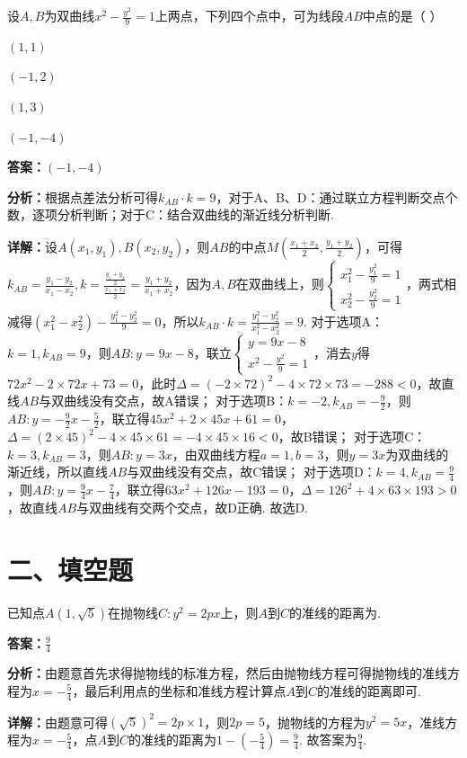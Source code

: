 \begin{question}[points=5]
设$A,B$为双曲线$x^2-\frac{y^2}{9}=1$上两点，下列四个点中，可为线段$AB$中点的是（   ）
\begin{choices}
  \item $(1,1)$
  \item $(-1,2)$
  \item $(1,3)$
  \item $(-1,-4)$
\end{choices}
\begin{solution}
\textbf{答案：}$(-1,-4)$

\textbf{分析：}根据点差法分析可得$k_{AB}\cdot k=9$，对于A、B、D：通过联立方程判断交点个数，逐项分析判断；对于C：结合双曲线的渐近线分析判断.

\textbf{详解：}设$A(x_1,y_1), B(x_2,y_2)$，则$AB$的中点$M(\frac{x_1+x_2}{2},\frac{y_1+y_2}{2})$，可得$k_{AB}=\frac{y_1-y_2}{x_1-x_2}, k=\frac{\frac{y_1+y_2}{2}}{\frac{x_1+x_2}{2}}=\frac{y_1+y_2}{x_1+x_2}$，因为$A,B$在双曲线上，则$\begin{cases}x_1^2-\frac{y_1^2}{9}=1\\x_2^2-\frac{y_2^2}{9}=1\end{cases}$，两式相减得$(x_1^2-x_2^2)-\frac{y_1^2-y_2^2}{9}=0$，所以$k_{AB}\cdot k=\frac{y_1^2-y_2^2}{x_1^2-x_2^2}=9$.
对于选项A：$k=1, k_{AB}=9$，则$AB: y=9x-8$，联立$\begin{cases}y=9x-8\\x^2-\frac{y^2}{9}=1\end{cases}$，消去$y$得$72x^2-2\times72x+73=0$，此时$\Delta=(-2\times72)^2-4\times72\times73=-288<0$，故直线$AB$与双曲线没有交点，故A错误；
对于选项B：$k=-2, k_{AB}=-\frac{9}{2}$，则$AB: y=-\frac{9}{2}x-\frac{5}{2}$，联立得$45x^2+2\times45x+61=0$，$\Delta=(2\times45)^2-4\times45\times61=-4\times45\times16<0$，故B错误；
对于选项C：$k=3, k_{AB}=3$，则$AB: y=3x$，由双曲线方程$a=1,b=3$，则$y=3x$为双曲线的渐近线，所以直线$AB$与双曲线没有交点，故C错误；
对于选项D：$k=4, k_{AB}=\frac{9}{4}$，则$AB: y=\frac{9}{4}x-\frac{7}{4}$，联立得$63x^2+126x-193=0$，$\Delta=126^2+4\times63\times193>0$，故直线$AB$与双曲线有交两个交点，故D正确. 故选D.
\end{solution}
\end{question}

\section*{二、填空题}

\begin{question}[points=5]
已知点$A(1,\sqrt{5})$在抛物线$C: y^2=2px$上，则$A$到$C$的准线的距离为.
\fillin[{$\frac{9}{4}$}]
\begin{solution}
\textbf{答案：}$\frac{9}{4}$

\textbf{分析：}由题意首先求得抛物线的标准方程，然后由抛物线方程可得抛物线的准线方程为$x=-\frac{5}{4}$，最后利用点的坐标和准线方程计算点$A$到$C$的准线的距离即可.

\textbf{详解：}由题意可得$(\sqrt{5})^2=2p\times1$，则$2p=5$，抛物线的方程为$y^2=5x$，准线方程为$x=-\frac{5}{4}$，点$A$到$C$的准线的距离为$1-(-\frac{5}{4})=\frac{9}{4}$. 故答案为$\frac{9}{4}$.
\end{solution}
\end{question}

